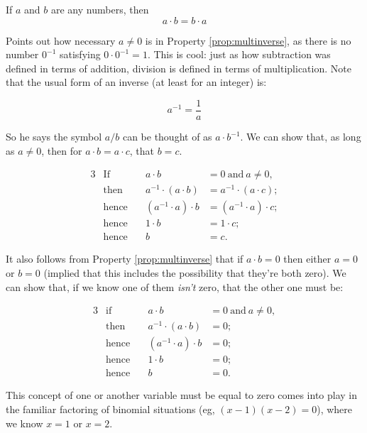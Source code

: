 \begin{property}
    If $a$ and $b$ are any numbers, then
    $$
    a \cdot b = b \cdot a
    $$
\end{property}

Points out how necessary $a\neq 0$ is in Property \ref{prop:multinverse}, as there is no
number $0^{-1}$ satisfying $0 \cdot 0^{-1} = 1$. This is cool: just as how subtraction was
defined in terms of addition, division is defined in terms of multiplication. Note that
the usual form of an inverse (at least for an integer) is:

$$
a^{-1} = \frac{1}{a}
$$

So he says the symbol $a/b$ can be thought of as $a \cdot b^{-1}$. We can show that, as
long as $a\neq 0$, then for $a \cdot b = a \cdot c$, that $b = c$.

\begin{alignat*}{3}
    &\text{If}\quad& a\cdot b  &= 0~\text{and}~ a \neq 0,\\
    &\text{then}\quad&   a^{-1} \cdot (a \cdot b)  &= a^{-1} \cdot (a \cdot c);\\
    & \text{hence}\quad&  (a^{-1} \cdot a) \cdot b  &= (a^{-1} \cdot a) \cdot c;\\
    & \text{hence} \quad & 1 \cdot b &= 1 \cdot c;\\
    & \text{hence} \quad & b&=c.
\end{alignat*}

It also follows from Property \ref{prop:multinverse} that if $a \cdot b = 0$ then either
$a = 0$ or $b = 0$ (implied that this includes the possibility that they're both zero). We
can show that, if we know one of them \emph{isn't} zero, that the other one must be:

\begin{alignat*}{3}
    &\text{if} \quad& a \cdot b &= 0~\text{and}~ a \neq 0,\\
    & \text{then} \quad& a^{-1} \cdot (a \cdot b) &= 0;\\
    & \text{hence} \quad& (a^{-1} \cdot a) \cdot b &= 0;\\ 
    & \text{hence} \quad& 1 \cdot b &= 0; \\
    & \text{hence} \quad& b &=0.
\end{alignat*}

This concept of one or another variable must be equal to zero comes into play in the
familiar factoring of binomial situations (eg, $(x-1)(x-2) = 0$), where we know $x = 1$ or
$x = 2$.

